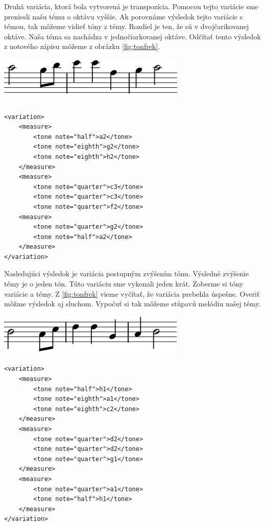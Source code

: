 Druhá variácia, ktorá bola vytvorená je transpozícia. Pomocou tejto variácie sme preniesli našu tému o oktávu vyššie. Ak porovnáme výsledok tejto variácie s témou, tak môžeme vidieť tóny z témy. Rozdiel je ten, že sú v dvojčarikovanej oktáve. Naša téma sa nachádza v jednočiarkovanej oktáve. Odčítať tento výsledok z notového zápisu môžeme z obrázku \ref{fig:tonfrek}.

\begin{minipage}{.45\textwidth}
\includegraphics[width=\textwidth]{thesis/obrazky-figures/var22.png}
\end{minipage}%
\begin{minipage}{.5\textwidth}
\centering
\lstset{language=XML}
\begin{lstlisting}[basicstyle=\tiny]
<variation>
    <measure>
        <tone note="half">a2</tone>
        <tone note="eighth">g2</tone>
        <tone note="eighth">h2</tone>
    </measure>
    <measure>
        <tone note="quarter">c3</tone>
        <tone note="quarter">c3</tone>
        <tone note="quarter">f2</tone>
    <measure>
        <tone note="quarter">g2</tone>
        <tone note="half">a2</tone>
    </measure>
</variation>
\end{lstlisting}
\end{minipage}

Nasledujúci výsledok je variácia postupným zvýšením tónu. Výsledné zvýšenie témy je o jeden tón. Túto variáciu sme vykonali jeden krát. Zoberme si tóny variácie a témy. Z \ref{fig:tonfrek} vieme vyčítať, že variácia prebehla úspešne. Overiť môžme výsledok aj sluchom. Vypočuť si tak môžeme stúpavú melódiu našej témy.

\begin{minipage}{.45\textwidth}
\includegraphics[width=\textwidth]{thesis/obrazky-figures/var3.png}
\end{minipage}%
\begin{minipage}{.5\textwidth}

\lstset{language=XML}
\begin{lstlisting}[basicstyle=\tiny]
<variation>
    <measure>
        <tone note="half">h1</tone>
        <tone note="eighth">a1</tone>
        <tone note="eighth">c2</tone>
    </measure>
    <measure>
        <tone note="quarter">d2</tone>
        <tone note="quarter">d2</tone>
        <tone note="quarter">g1</tone>
    </measure>
    <measure>
        <tone note="quarter">a1</tone>
        <tone note="half">h1</tone>
    </measure>
</variation>
\end{lstlisting}
\end{minipage}

